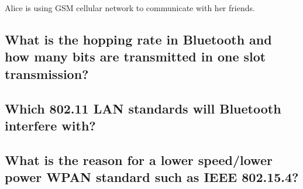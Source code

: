 \documentclass[a4paper]{report}
\begin{document}
Alice is using GSM cellular network to communicate with her friends.

\subsection{What is the hopping rate in Bluetooth and how many bits are
            transmitted in one slot transmission?}


\subsection{Which 802.11 LAN standards will Bluetooth interfere with?}


\subsection{What is the reason for a lower speed/lower power WPAN standard
            such as IEEE 802.15.4?}
\end{document}
